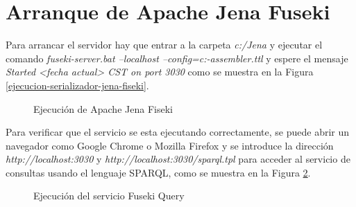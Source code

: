 \section{Arranque de Apache Jena Fuseki}

Para arrancar el servidor hay que entrar a la carpeta \textit{c:/Jena} y ejecutar el comando \textit{ fuseki-server.bat –localhost –config=c:\dspace\config\modules\rdf\fuseki-assembler.ttl} y espere el mensaje \textit{Started <fecha actual> CST on port 3030} como se muestra en la Figura \ref{ejecucion-serializador-jena-fiseki}.

\begin{figure}[!ht]
	\centering
    \caption{Ejecución de Apache Jena Fiseki}
    \label{ejecucion-jena-fiseki}
\end{figure}

Para verificar que el servicio se esta ejecutando correctamente, se puede abrir un navegador como Google Chrome o Mozilla Firefox y se introduce la dirección \textit{http://localhost:3030} y \textit{http://localhost:3030/sparql.tpl} para acceder al servicio de consultas usando el lenguaje SPARQL, como se muestra en la Figura \ref{ejecucion-jena-fiseki-query}.

\begin{figure}[!ht]
	\centering
    \caption{Ejecución del servicio Fuseki Query}
    \label{ejecucion-jena-fiseki-query}
\end{figure}

